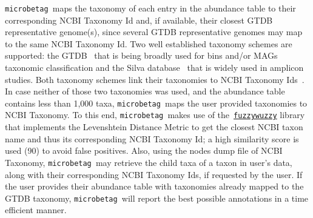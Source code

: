 \documentclass[sn-mathphys,Numbered]{sn-jnl}  %
\theoremstyle{thmstyleone}%
\theoremstyle{thmstyletwo}%
\theoremstyle{thmstylethree}%
\newcommand{\microbetag}{\texttt{microbetag }}
\begin{document}
        \microbetag maps the taxonomy of each entry in the abundance table to their corresponding NCBI Taxonomy Id and, if available, their closest GTDB representative genome(s), since several GTDB representative genomes may map to the same NCBI Taxonomy Id.
        Two well established taxonomy schemes are supported: the GTDB~\cite{parks2022gtdb} that is being broadly used for bins and/or MAGs taxonomic classification and the Silva database~\cite{quast2012silva} that is widely used in amplicon studies. Both taxonomy schemes link their taxonomies to NCBI Taxonomy Ids~\cite{schoch2020ncbi}.
        In case neither of those two taxonomies was used, and the abundance table contains less than 1,000 taxa, \microbetag maps the user provided taxonomies to NCBI Taxonomy. 
        To this end, \microbetag makes use of the~\href{https://github.com/seatgeek/thefuzz}{\texttt{fuzzywuzzy}} library that implements the Levenshtein Distance Metric to get the closest NCBI taxon name and thus its corresponding NCBI Taxonomy Id; a high similarity score is used (90) to avoid false positives. 
        Also, using the nodes dump file of NCBI Taxonomy, \microbetag may retrieve the child taxa of a taxon in user's data, along with their corresponding NCBI Taxonomy Ids, if requested by the user.
        If the user provides their abundance table with taxonomies already mapped to the GTDB taxonomy, \microbetag will report the best possible annotations in a time efficient manner. 
        
        
        
\end{document}
